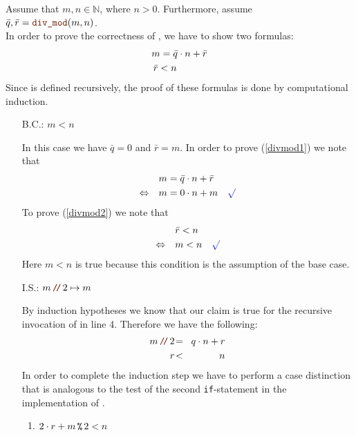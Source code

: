 \proof
Assume that $m,n \in \mathbb{N}$, where $n > 0$.  Furthermore, assume
\\[0.2cm]
\hspace*{1.3cm}
$\bar{q}, \bar{r} = \mytt{div\_mod}(m, n)$.
\\[0.2cm] 
In order to prove the correctness of , we have to show two formulas:
\begin{align}
m = \bar{q} \cdot n + \bar{r} \label{divmod1} \\
\bar{r} < n \hspace*{1.1cm} \label{divmod2}
\end{align}
Since  is defined recursively, the proof of these formulas is done by computational induction.
\begin{enumerate}
\item[B.C.:] $m < n$

  In this case we have $\bar{q} = 0$ and $\bar{r} = m$.
  In order to prove (\ref{divmod1}) we note that 
  \begin{align*}
                    & m = \bar{q} \cdot n + \bar{r} \\
    \Leftrightarrow\quad & m = 0 \cdot n + m \quad \green{\surd}
  \end{align*}
  To prove (\ref{divmod2}) we note that
  \begin{align*}
                         & \bar{r} < n \\
    \Leftrightarrow\quad & m < n \quad\green{\surd}
  \end{align*}
  Here $m < n$ is true because this condition is the assumption of the base case.
\item[I.S.:] $m \dv 2 \mapsto m$

  By induction hypotheses we know that our claim is true for the recursive invocation of  in
  line 4.  Therefore we have the following:
  \begin{eqnarray}
    m \dv 2 &\!=\! & q \cdot n + r \label{divmod3} \\
          r &\!<\! & n             \label{divmod4}
  \end{eqnarray}
  In order to complete the induction step we have to perform a case distinction that is analogous to the test
  of the second \texttt{if}-statement in the implementation of .
  \begin{enumerate}
  \item $2 \cdot r + m \,\texttt{\%}\, 2 < n$


\end{enumerate}
\end{enumerate}

